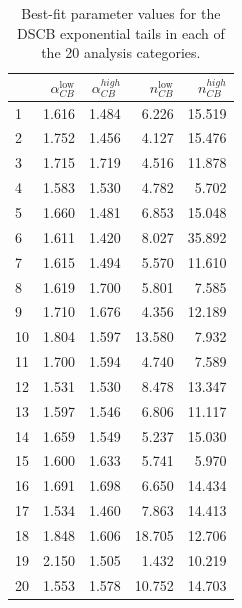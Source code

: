 \begin{table}[!htp]
\begin{center}
\begin{tabular}{lrrrr}
        \hline
        {} & $\alpha_{CB}^\text{low}$ & $\alpha_{CB}^{high}$ & $n_{CB}^\text{low}$ & $n_{CB}^{high}$ \\
        \hline
        1 & 1.616 & 1.484 & 6.226 & 15.519 \\
        2 & 1.752 & 1.456 & 4.127 & 15.476 \\
        3 & 1.715 & 1.719 & 4.516 & 11.878 \\
        4 & 1.583 & 1.530 & 4.782 & 5.702 \\
        5 & 1.660 & 1.481 & 6.853 & 15.048 \\
        6 & 1.611 & 1.420 & 8.027 & 35.892 \\
        7 & 1.615 & 1.494 & 5.570 & 11.610 \\
        8 & 1.619 & 1.700 & 5.801 & 7.585 \\
        9 & 1.710 & 1.676 & 4.356 & 12.189 \\
        10 & 1.804 & 1.597 & 13.580 & 7.932 \\
        11 & 1.700 & 1.594 & 4.740 & 7.589 \\
        12 & 1.531 & 1.530 & 8.478 & 13.347\\ \hline
        13 & 1.597& 1.546 & 6.806 & 11.117\\
        14 & 1.659 & 1.549 & 5.237 & 15.030\\
        15 & 1.600 & 1.633 & 5.741 & 5.970\\
        16 & 1.691 & 1.698 & 6.650 & 14.434 \\
        17 & 1.534 & 1.460 & 7.863 & 14.413 \\
        18 & 1.848 & 1.606 & 18.705 & 12.706 \\
        19 & 2.150 & 1.505 & 1.432 & 10.219\\
        20 & 1.553 & 1.578 & 10.752 & 14.703\\
        \hline
\end{tabular}
\caption{Best-fit parameter values for the DSCB exponential tails in each of the 20 analysis categories.}
\label{tab:sig_param2}
\end{center}
\end{table}


